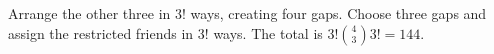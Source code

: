Arrange the other three in $3!$ ways, creating four gaps. Choose three gaps and assign the restricted friends in $3!$ ways. The total is $3!\binom43 3!=\boxed{144}$.
